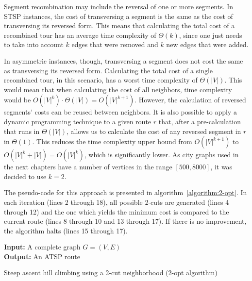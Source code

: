 Segment recombination may include the reversal of one or more segments. In STSP
instances, the cost of transversing a segment is the same as the cost of
transversing its reversed form. This means that calculating the total cost of a
recombined tour has an average time complexity of $\Theta(k)$, since one just
needs to take into account $k$ edges that were removed and $k$ new edges that
were added.

In asymmetric instances, though, transversing a segment does not cost the same
as transversing its reversed form. Calculating the total cost of a single
recombined tour, in this scenario, has a worst time complexity of $\Theta(|V|)$.
This would mean that when calculating the cost of all neighbors, time complexity
would be $O(|V|^k) \cdot \Theta(|V|) = O(|V|^{k+1})$. However, the calculation
of reversed segments' costs can be reused between neighbors. It is also possible
to apply a dynamic programming technique to a given route $r$ that, after a
pre-calculation that runs in $\Theta(|V|)$, allows us to calculate the cost of
any reversed segment in $r$ in $\Theta(1)$. This reduces the time complexity
upper bound from $O(|V|^{k+1})$ to $O(|V|^k + |V|) = O(|V|^k)$, which is
significantly lower.  As city graphs used in the next chapters have a number of
vertices in the range $[500, 8000]$, it was decided to use $k = 2$.

The pseudo-code for this approach is presented in
algorithm~\ref{algorithm:2-opt}. In each iteration (lines 2 through 18), all
possible 2-cuts are generated (lines 4 through 12) and the one which yields the
minimum cost is compared to the current route (lines 8 through 10 and 13 through
17). If there is no improvement, the algorithm halts (lines 15 through 17).

\begin{algorithm}
  \textbf{Input:} A complete graph $G=(V,E)$ \\
  \textbf{Output:} An ATSP route
  \begin{algorithmic}[1]
    \LOOP
          \ENDIF
        \ENDFOR
      \ENDFOR

      \ENDIF
    \ENDLOOP
  \end{algorithmic}
  \caption{Steep ascent hill climbing using a 2-cut neighborhood (2-opt
  algorithm)}
  \label{algorithm:2-opt}
\end{algorithm}


